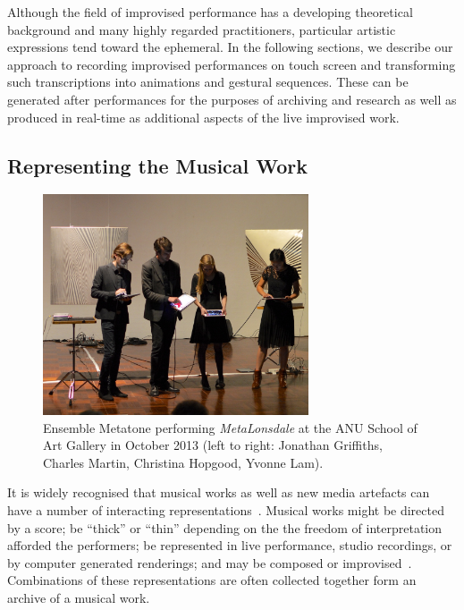 \documentclass[graybox]{svmult}
\begin{document}
Although the field of improvised performance has a developing
theoretical background and many highly regarded practitioners,
particular artistic expressions tend toward the ephemeral. In the
following sections, we describe our approach to recording improvised
performances on touch screen and transforming such transcriptions into
animations and gestural sequences. These can be generated after
performances for the purposes of archiving and research as well
as produced in real-time as additional aspects of the live improvised work.

\subsection{Representing the Musical Work}

\begin{figure}
  \centering
  \includegraphics[width=0.7\textwidth]{figures/ensemblemetatone}
  \caption{Ensemble Metatone performing \emph{MetaLonsdale} at the ANU
    School of Art Gallery in October 2013 (left to right: Jonathan
    Griffiths, Charles Martin, Christina Hopgood, Yvonne Lam).}
  \label{ensemblemetatoneperforming}
\end{figure}

It is widely recognised that musical works as well as new media
artefacts can have a number of interacting
representations~\cite{Rinehart:2007pi}. Musical works might be
directed by a score; be ``thick'' or ``thin'' depending on the the
freedom of interpretation afforded the performers; be represented in
live performance, studio recordings, or by computer generated
renderings; and may be composed or improvised~\cite{Davies:2005fj}.
Combinations of these representations are often collected together
form an archive of a musical work.
\end{document}
